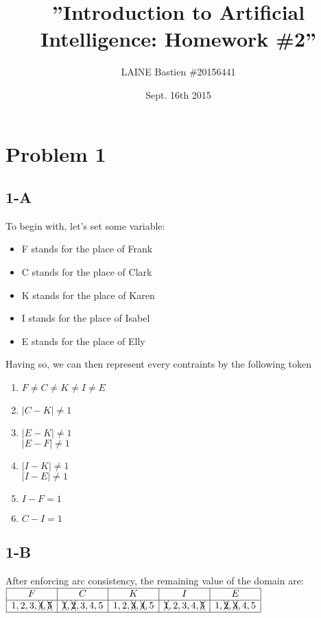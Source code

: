 \documentclass{article}
\begin{document}
    \title{\textbf{''Introduction to Artificial Intelligence: Homework \#2''}}
    \author{LAINE Bastien \#20156441}
    \date{Sept. 16th 2015}
    \maketitle
    \tableofcontents

    \newpage

    \section{Problem 1}
        \subsection{1-A}
            To begin with, let's set some variable:
            \begin{itemize}
                \item F stands for the place of Frank
                \item C stands for the place of Clark
                \item K stands for the place of Karen
                \item I stands for the place of Isabel
                \item E stands for the place of Elly
            \end{itemize}
            Having so, we can then represent every contraints by the following token
            \begin{enumerate}
                \item $F\ne C\ne K\ne I\ne E$
                \item $|C-K|\ne 1$
                \item $|E-K|\ne 1$\\
                    $|E-F|\ne 1$
                \item $|I-K|\ne 1$\\
                    $|I-E|\ne 1$
                \item $I-F=1$
                \item $C-I=1$
            \end{enumerate}
        \subsection{1-B}
            After enforcing arc consistency, the remaining value of the domain are:\\
            $\begin{array}{|c|c|c|c|c|}
                \hline
                F&C&K&I&E\\
                \hline
                1,2,3,\xcancel{4},\xcancel{5}&\xcancel{1},\xcancel{2},3,4,5&1,2,\xcancel{3},\xcancel{4},5&\xcancel{1},2,3,4,\xcancel{5}&1,\xcancel{2},\xcancel{3},4,5\\
                \hline
            \end{array}$
\end{document}
